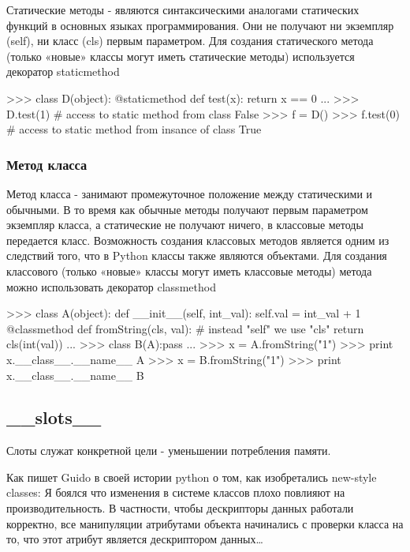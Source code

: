 Статические методы - являются синтаксическими аналогами статических функций в основных языках программирования. Они не получают ни экземпляр (self), ни класс (cls) первым параметром. Для создания статического метода (только «новые» классы могут иметь статические методы) используется декоратор staticmethod

\begin{python}
>>> class D(object):  
       @staticmethod
       def test(x):
           return x == 0
...
>>> D.test(1)    # access to static method from class
False
>>> f = D()
>>> f.test(0)    # access to static method from insance of class
True

\end{python}

\subsubsection{Метод класса}

Метод класса - занимают промежуточное положение между статическими и обычными. В то время как обычные методы получают первым параметром экземпляр класса, а статические не получают ничего, в классовые методы передается класс. Возможность создания классовых методов является одним из следствий того, что в Python классы также являются объектами. Для создания классового (только «новые» классы могут иметь классовые методы) метода можно использовать декоратор classmethod

\begin{python}
>>> class A(object):  
      def __init__(self, int_val):
          self.val = int_val + 1
      @classmethod
      def fromString(cls, val):   # instead "self" we use "cls"
          return cls(int(val))
...
>>> class B(A):pass
...
>>> x = A.fromString("1")
>>> print x.__class__.__name__
A
>>> x = B.fromString("1")
>>> print x.__class__.__name__
B	
\end{python}

\subsection{\_\_slots\_\_}

Слоты служат конкретной цели - уменьшении потребления памяти.

Как пишет Guido в своей истории python о том, как изобретались new-style classes:
	Я боялся что изменения в системе классов плохо повлияют на производительность. В частности, чтобы дескрипторы данных работали корректно, все манипуляции атрибутами объекта начинались с проверки  класса на то, что этот атрибут является дескриптором данных…
	
